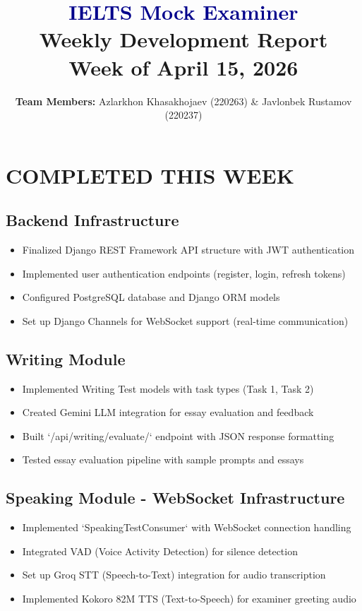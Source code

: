\documentclass[11pt]{article}
\title{\huge \textcolor{darkblue}{\textbf{IELTS Mock Examiner}}\\\Large Weekly Development Report\\\small Week of April 15, 2026}
\author{\textbf{Team Members:} Azlarkhon Khasakhojaev (220263) \& Javlonbek Rustamov (220237)}
\date{}
\begin{document}
\maketitle
\vspace{0.5cm}

\section*{COMPLETED THIS WEEK}

\subsection{Backend Infrastructure}
\begin{itemize}[leftmargin=2em]
    \item Finalized Django REST Framework API structure with JWT authentication
    \item Implemented user authentication endpoints (register, login, refresh tokens)
    \item Configured PostgreSQL database and Django ORM models
    \item Set up Django Channels for WebSocket support (real-time communication)
\end{itemize}

\subsection{Writing Module}
\begin{itemize}[leftmargin=2em]
    \item Implemented Writing Test models with task types (Task 1, Task 2)
    \item Created Gemini LLM integration for essay evaluation and feedback
    \item Built `/api/writing/evaluate/` endpoint with JSON response formatting
    \item Tested essay evaluation pipeline with sample prompts and essays
\end{itemize}

\subsection{Speaking Module - WebSocket Infrastructure}
\begin{itemize}[leftmargin=2em]
    \item Implemented `SpeakingTestConsumer` with WebSocket connection handling
    \item Integrated VAD (Voice Activity Detection) for silence detection
    \item Set up Groq STT (Speech-to-Text) integration for audio transcription
    \item Implemented Kokoro 82M TTS (Text-to-Speech) for examiner greeting audio
\end{itemize}
\end{document}
